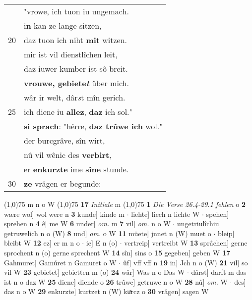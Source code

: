 \documentclass[8pt,a4paper,notitlepage]{article}
\begin{document}
\begin{table}[ht]
\begin{minipage}[t]{0.5\linewidth}
\begin{tabular}{rl}
 & "vrowe, ich tuon iu ungemach.\\ 
 & i\textbf{n} kan ze lange sitzen,\\ 
20 & daz tuon ich niht \textbf{mit} witzen.\\ 
 & mir ist vil dienstlîchen leit,\\ 
 & daz iuwer kumber ist sô breit.\\ 
 & \textbf{vrouwe, gebiete\textit{t}} über mich.\\ 
 & wâr ir welt, dâr\textit{s}t mîn gerich.\\ 
25 & ich diene iu \textbf{allez}, \textbf{daz} ich sol."\\ 
 & \textbf{si sprach}: "hêrre, \textbf{daz trûwe ich} wol."\\ 
 & der burcgrâve, sîn wirt,\\ 
 & nû vil wênic des \textbf{verbirt},\\ 
 & er \textbf{en}\textbf{kurzte} ime \textbf{sîne} stunde.\\ 
30 & \textbf{ze} vrâgen er begunde:\\ 
\end{tabular}
\scriptsize
\line(1,0){75} \newline
m n o W \newline
\line(1,0){75} \newline
\textbf{17} \textit{Initiale} m  \newline
\line(1,0){75} \newline
\textbf{1} \textit{Die Verse 26.4-29.1 fehlen} o  \textbf{2} wære wol] wol were n \textbf{3} kunde] kinde m  $\cdot$ liehte] liech n lichte W  $\cdot$ spehen] sprehen n \textbf{4} ê] me W \textbf{6} under] \textit{om.} m \textbf{7} vil] \textit{om.} n o W  $\cdot$ ungetriulîchiu] getruwelich n o (W) \textbf{8} und] \textit{om.} o W \textbf{11} müete] jnnet n (W) muet o  $\cdot$ bleip] bleibt W \textbf{12} ez] er m n o  $\cdot$ ie] E n (o)  $\cdot$ vertreip] vertreibt W \textbf{13} sprâchen] gerne sprochent n (o) gerne sprechent W \textbf{14} sîn] sins o \textbf{15} gegeben] geben W \textbf{17} Gahmuret] Gamúret n Gamuret o W  $\cdot$ ûf] vff vff n \textbf{19} in] Jch n o (W) \textbf{21} vil] so vil W \textbf{23} gebietet] gebietten m (o) \textbf{24} wâr] Was n o Das W  $\cdot$ dârst] darft m das ist n o daz W \textbf{25} diene] diende o \textbf{26} trûwe] getruwe n o W \textbf{28} nû] \textit{om.} W  $\cdot$ des] das n o W \textbf{29} enkurzte] kurtzet n (W) kuͯrcz o \textbf{30} vrâgen] sagen W \newline
\end{minipage}
\end{table}
\end{document}
